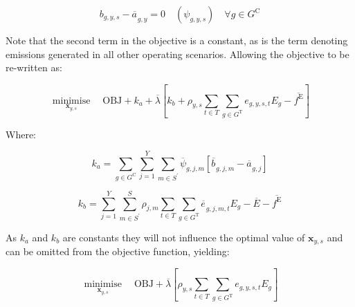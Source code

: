 \documentclass{article}
\newcommand{\sGeneratorsCandidate}{G^{\mathrm{C}}}
\newcommand{\sGeneratorsThermal}{G^{\mathrm{T}}}
\newcommand{\sYears}{Y}
\newcommand{\sScenarios}{S}
\newcommand{\sIntervals}{T}
\newcommand{\iGenerator}{g}
\newcommand{\iYear}{y}
\newcommand{\iYearAlias}{j}
\newcommand{\iScenario}{s}
\newcommand{\iScenarioAlias}{m}
\newcommand{\iInterval}{t}
\newcommand{\cScenarioDuration}[1][\iYear,\iScenario]{\rho_{#1}}
\newcommand{\cEmissionsIntensity}[1][\iGenerator]{E_{#1}}
\newcommand{\cEmmissionsCumulativeTarget}{\overline{E}}
\newcommand{\cObjectiveFunction}{\mathrm{OBJ}}
\newcommand{\vEnergy}[1][\iGenerator,\iYear,\iScenario,\iInterval]{e_{#1}}
\newcommand{\vEmissionsTargetViolation}{f^{\mathrm{E}}}
\newcommand{\vInstalledCapacityTotal}[1][\iGenerator,\iYear]{a_{#1}}
\newcommand{\vInstalledCapacityTotalScenario}[1][\iGenerator,\iYear,\iScenario]{b_{#1}}
\DeclareMathOperator*{\minimise}{minimise}
\begin{document}
\begin{equation}
\vInstalledCapacityTotalScenario - \overline{\vInstalledCapacityTotal[]}_{\iGenerator,\iYear} = 0 \quad (\psi_{\iGenerator,\iYear,\iScenario}) \quad \forall \iGenerator \in \sGeneratorsCandidate
\end{equation}

Note that the second term in the objective is a constant, as is the term denoting emissions generated in all other operating scenarios. Allowing the objective to be re-written as:

\begin{equation}
	\minimise\limits_{\bm{x}_{\iYear,\iScenario}} \quad\cObjectiveFunction + k_{a} + \overline{\lambda} \left[k_{b} + \cScenarioDuration\sum\limits_{\iInterval \in \sIntervals}\sum\limits_{\iGenerator \in \sGeneratorsThermal} \vEnergy[\iGenerator,\iYear,\iScenario,\iInterval] \cEmissionsIntensity - \overline{\vEmissionsTargetViolation}\right]
\end{equation}

Where:

\begin{equation}
	k_{a} = \sum\limits_{\iGenerator \in \sGeneratorsCandidate}\sum\limits_{\iYearAlias=1}^{\sYears}\sum\limits_{\iScenarioAlias \in\sScenarios^{\prime}}\overline{\psi}_{\iGenerator,\iYearAlias,\iScenarioAlias}\left[\overline{\vInstalledCapacityTotalScenario[]}_{\iGenerator,\iYearAlias,\iScenarioAlias} - \overline{\vInstalledCapacityTotal[]}_{\iGenerator,\iYearAlias}\right]
\end{equation}

\begin{equation}
	k_{b} = \sum\limits_{\iYearAlias=1}^{\sYears} \sum\limits_{\iScenarioAlias \in \sScenarios^{\prime}}^{\sScenarios} \cScenarioDuration[\iYearAlias,\iScenarioAlias] \sum\limits_{\iInterval \in \sIntervals} \sum\limits_{\iGenerator \in \sGeneratorsThermal} \overline{\vEnergy[]}_{\iGenerator,\iYearAlias,\iScenarioAlias,\iInterval} \cEmissionsIntensity - \cEmmissionsCumulativeTarget - \overline{\vEmissionsTargetViolation}
\end{equation}

As $k_{a}$ and $k_{b}$ are constants they will not influence the optimal value of $\bm{x}_{\iYear,\iScenario}$ and can be omitted from the objective function, yielding:

\begin{equation}
	\minimise\limits_{\bm{x}_{\iYear,\iScenario}} \quad \cObjectiveFunction + \overline{\lambda} \left[\cScenarioDuration\sum\limits_{\iInterval \in \sIntervals}\sum\limits_{\iGenerator \in \sGeneratorsThermal} \vEnergy[\iGenerator,\iYear,\iScenario,\iInterval] \cEmissionsIntensity \right]
\end{equation}
\end{document}
